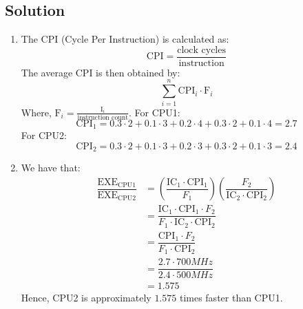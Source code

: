 \subsection*{Solution}
\begin{enumerate}
    \item The CPI (Cycle Per Instruction) is calculated as:
        \[\text{CPI}=\dfrac{\text{clock cycles}}{\text{instruction}}\]
        The average CPI is then obtained by:
        \[\sum_{i=1}^{n}\text{CPI}_i \cdot \text{F}_i\]
        Where, $\text{F}_i=\frac{\text{I}_i}{\text{instruction count}}$. 
        For CPU1:
        \[\text{CPI}_1=0.3 \cdot 2 + 0.1 \cdot 3 + 0.2 \cdot 4 + 0.3 \cdot 2 + 0.1 \cdot 4=2.7\]
        For CPU2:
        \[\text{CPI}_2=0.3 \cdot 2 + 0.1 \cdot 3 + 0.2 \cdot 3 + 0.3 \cdot 2 + 0.1 \cdot 3=2.4\]
    \item We have that: 
        \begin{align*}
            \dfrac{{\text{EXE}_{\text{CPU1}}}}{{\text{EXE}_{\text{CPU2}}}}  &=\left( \dfrac{\text{IC}_1 \cdot \text{CPI}_1}{F_1} \right)\left( \dfrac{F_2}{\text{IC}_2 \cdot \text{CPI}_2} \right) \\
                                                                            &=\dfrac{\text{IC}_1 \cdot \text{CPI}_1 \cdot F_2}{F_1 \cdot \text{IC}_2 \cdot \text{CPI}_2} \\
                                                                            &=\dfrac{\text{CPI}_1 \cdot F_2}{F_1 \cdot \text{CPI}_2} \\
                                                                            &=\dfrac{2.7 \cdot 700 MHz}{2.4 \cdot 500 MHz} \\
                                                                            &=1.575
        \end{align*}
        Hence, CPU2 is approximately $1.575$ times faster than CPU1.
\end{enumerate}